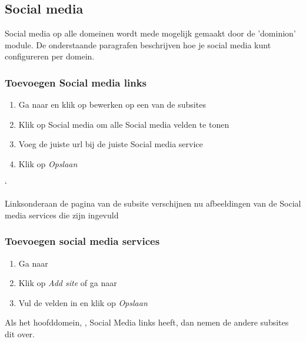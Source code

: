 \subsection{Social media}\label{socialmedia}
Social media op alle domeinen wordt mede mogelijk gemaakt door de 'dominion' module. 
De onderstaande paragrafen beschrijven hoe je social media kunt configureren per domein. 

\subsubsection{Toevoegen Social media links}

\begin{enumerate}
\item Ga naar   en klik op bewerken op een van de subsites
\item Klik op Social media om alle Social media velden te tonen
\item Voeg de juiste url bij de juiste Social media service
\item Klik op \emph{Opslaan}
\end{enumerate}`

Linksonderaan de pagina van de subsite verschijnen nu afbeeldingen van de Social media services die zijn ingevuld

\subsubsection{Toevoegen social media services}

\begin{enumerate}
\item Ga naar   
\item Klik op \emph{Add site} of ga naar 
\item Vul de velden in en klik op \emph{Opslaan}
\end{enumerate}

Als het hoofddomein, \drupalpath, Social Media links heeft, dan nemen de andere subsites dit over.